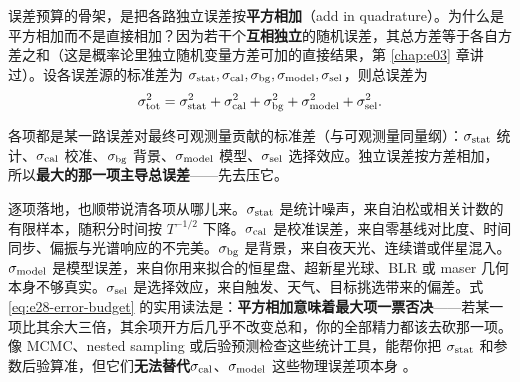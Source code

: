 误差预算的骨架，是把各路独立误差按\textbf{平方相加}（add in quadrature）。为什么是平方相加而不是直接相加？因为若干个\textbf{互相独立}的随机误差，其总方差等于各自方差之和（这是概率论里独立随机变量方差可加的直接结果，第 \ref{chap:e03} 章讲过）。设各误差源的标准差为 \(\sigma_{\rm stat},\sigma_{\rm cal},\sigma_{\rm bg},\sigma_{\rm model},\sigma_{\rm sel}\)，则总误差为
\begin{equation}
  \sigma_{\rm tot}^2
  =
  \sigma_{\rm stat}^2
  +\sigma_{\rm cal}^2
  +\sigma_{\rm bg}^2
  +\sigma_{\rm model}^2
  +\sigma_{\rm sel}^2 .
  \label{eq:e28-error-budget}
\end{equation}
\begin{formulaexplain}
各项都是某一路误差对最终可观测量贡献的标准差（与可观测量同量纲）：\(\sigma_{\rm stat}\) 统计、\(\sigma_{\rm cal}\) 校准、\(\sigma_{\rm bg}\) 背景、\(\sigma_{\rm model}\) 模型、\(\sigma_{\rm sel}\) 选择效应。独立误差按方差相加，所以\textbf{最大的那一项主导总误差}——先去压它。
\end{formulaexplain}
逐项落地，也顺带说清各项从哪儿来。\(\sigma_{\rm stat}\) 是统计噪声，来自泊松或相关计数的有限样本，随积分时间按 \(T^{-1/2}\) 下降。\(\sigma_{\rm cal}\) 是校准误差，来自零基线对比度、时间同步、偏振与光谱响应的不完美。\(\sigma_{\rm bg}\) 是背景，来自夜天光、连续谱或伴星混入。\(\sigma_{\rm model}\) 是模型误差，来自你用来拟合的恒星盘、超新星光球、BLR 或 maser 几何本身不够真实。\(\sigma_{\rm sel}\) 是选择效应，来自触发、天气、目标挑选带来的偏差。式 \eqref{eq:e28-error-budget} 的实用读法是：\textbf{平方相加意味着最大项一票否决}——若某一项比其余大三倍，其余项开方后几乎不改变总和，你的全部精力都该去砍那一项。像 MCMC、nested sampling 或后验预测检查这些统计工具，能帮你把 \(\sigma_{\rm stat}\) 和参数后验算准，但它们\textbf{无法替代}\(\sigma_{\rm cal}\)、\(\sigma_{\rm model}\) 这些物理误差项本身 \citep{2013PASP..125..306F,2009MNRAS.398.1601F,1979ApJ...228..939C,2013ApJ...764..167S}。

